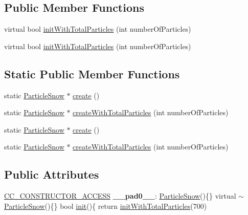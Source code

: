 \subsection*{Public Member Functions}
\begin{DoxyCompactItemize}
\item 
virtual bool \hyperlink{classParticleSnow_ab6621eb3a4940edf86739df88fc63308}{init\+With\+Total\+Particles} (int number\+Of\+Particles)
\item 
virtual bool \hyperlink{classParticleSnow_a298dd9a158e39d502732998c55e86528}{init\+With\+Total\+Particles} (int number\+Of\+Particles)
\end{DoxyCompactItemize}
\subsection*{Static Public Member Functions}
\begin{DoxyCompactItemize}
\item 
static \hyperlink{classParticleSnow}{Particle\+Snow} $\ast$ \hyperlink{classParticleSnow_a5068271adb89ac4930eae345afade3a0}{create} ()
\item 
static \hyperlink{classParticleSnow}{Particle\+Snow} $\ast$ \hyperlink{classParticleSnow_a4e1d27cfe2bdc2caa5b46bff9b2923a1}{create\+With\+Total\+Particles} (int number\+Of\+Particles)
\item 
static \hyperlink{classParticleSnow}{Particle\+Snow} $\ast$ \hyperlink{classParticleSnow_ae546c0f065ff090d275923d24ed7cf19}{create} ()
\item 
static \hyperlink{classParticleSnow}{Particle\+Snow} $\ast$ \hyperlink{classParticleSnow_a0d9b7215cd5c684eca9e6fbb8f45db48}{create\+With\+Total\+Particles} (int number\+Of\+Particles)
\end{DoxyCompactItemize}
\subsection*{Public Attributes}
\begin{DoxyCompactItemize}
\item 
\mbox{\label{classParticleSnow_a0d5f8c110fa07546dee42b770fe370ee}} 
\hyperlink{_2cocos2d_2cocos_2base_2ccConfig_8h_a25ef1314f97c35a2ed3d029b0ead6da0}{C\+C\+\_\+\+C\+O\+N\+S\+T\+R\+U\+C\+T\+O\+R\+\_\+\+A\+C\+C\+E\+SS} {\bfseries \+\_\+\+\_\+pad0\+\_\+\+\_\+}\+: \hyperlink{classParticleSnow}{Particle\+Snow}()\{\} virtual $\sim$\hyperlink{classParticleSnow}{Particle\+Snow}()\{\} bool \hyperlink{classParticleSystem_a65c05b30432f6e8aeb45ba018f3a8d3f}{init}()\{ return \hyperlink{classParticleSnow_ab6621eb3a4940edf86739df88fc63308}{init\+With\+Total\+Particles}(700)
\end{DoxyCompactItemize}
